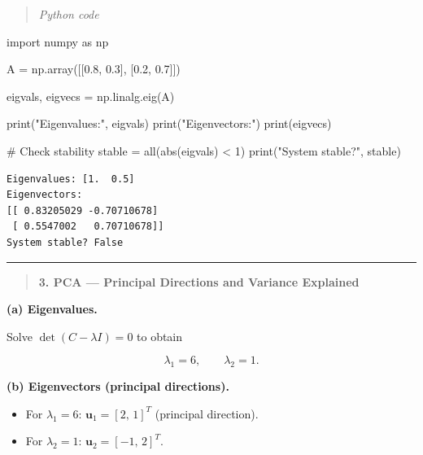 \documentclass[
  letterpaper,
  DIV=11,
  numbers=noendperiod]{scrreprt}
\newenvironment{Shaded}{\begin{snugshade}}{\end{snugshade}}
\newcommand{\BuiltInTok}[1]{\textcolor[rgb]{0.00,0.23,0.31}{#1}}
\newcommand{\CommentTok}[1]{\textcolor[rgb]{0.37,0.37,0.37}{#1}}
\newcommand{\DecValTok}[1]{\textcolor[rgb]{0.68,0.00,0.00}{#1}}
\newcommand{\FloatTok}[1]{\textcolor[rgb]{0.68,0.00,0.00}{#1}}
\newcommand{\ImportTok}[1]{\textcolor[rgb]{0.00,0.46,0.62}{#1}}
\newcommand{\NormalTok}[1]{\textcolor[rgb]{0.00,0.23,0.31}{#1}}
\newcommand{\OperatorTok}[1]{\textcolor[rgb]{0.37,0.37,0.37}{#1}}
\newcommand{\StringTok}[1]{\textcolor[rgb]{0.13,0.47,0.30}{#1}}
\providecommand{\tightlist}{%
  \setlength{\itemsep}{0pt}\setlength{\parskip}{0pt}}
\begin{document}
\begin{quote}
\emph{Python code}
\end{quote}

\begin{Shaded}
\begin{Highlighting}[]
\ImportTok{import}\NormalTok{ numpy }\ImportTok{as}\NormalTok{ np}

\NormalTok{A }\OperatorTok{=}\NormalTok{ np.array([[}\FloatTok{0.8}\NormalTok{, }\FloatTok{0.3}\NormalTok{],}
\NormalTok{              [}\FloatTok{0.2}\NormalTok{, }\FloatTok{0.7}\NormalTok{]])}

\NormalTok{eigvals, eigvecs }\OperatorTok{=}\NormalTok{ np.linalg.eig(A)}

\BuiltInTok{print}\NormalTok{(}\StringTok{"Eigenvalues:"}\NormalTok{, eigvals)}
\BuiltInTok{print}\NormalTok{(}\StringTok{"Eigenvectors:"}\NormalTok{)}
\BuiltInTok{print}\NormalTok{(eigvecs)}

\CommentTok{\# Check stability}
\NormalTok{stable }\OperatorTok{=} \BuiltInTok{all}\NormalTok{(}\BuiltInTok{abs}\NormalTok{(eigvals) }\OperatorTok{\textless{}} \DecValTok{1}\NormalTok{)}
\BuiltInTok{print}\NormalTok{(}\StringTok{"System stable?"}\NormalTok{, stable)}
\end{Highlighting}
\end{Shaded}

\begin{verbatim}
Eigenvalues: [1.  0.5]
Eigenvectors:
[[ 0.83205029 -0.70710678]
 [ 0.5547002   0.70710678]]
System stable? False
\end{verbatim}

\begin{center}\rule{0.5\linewidth}{0.5pt}\end{center}

\begin{quote}
\textbf{3. PCA --- Principal Directions and Variance Explained}
\end{quote}

\textbf{(a) Eigenvalues.}

Solve \(\det(C-\lambda I)=0\) to obtain

\[\lambda_1 = 6,\qquad \lambda_2 = 1.\]

\textbf{(b) Eigenvectors (principal directions).}

\begin{itemize}
\tightlist
\item
  For \(\lambda_1=6\): \(\mathbf u_1=[2,\,1]^T\) (principal direction).
\item
  For \(\lambda_2=1\): \(\mathbf u_2=[-1,\,2]^T\).
\end{itemize}
\end{document}
